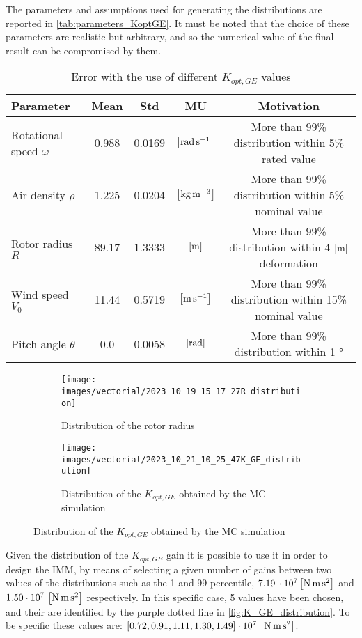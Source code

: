 The parameters and assumptions used for generating the distributions are reported in \autoref{tab:parameters_KoptGE}. It must be noted that the choice of these parameters are realistic but arbitrary, and so the numerical value of the final result can be compromised by them.

\begin{table}[htb]
  \caption{Error with the use of different $K_{opt,GE}$ values}
  \centering
  \begin{tabular}{lcccc}
  \toprule
  Parameter & Mean & Std & MU & Motivation\\ \midrule
  Rotational speed $\omega$ & 0.988 & 0.0169 & $\left[\si{\radian\per\second}\right]$ & More than 99\% distribution within 5\% rated value\\
  Air density $\rho$ &  1.225 & 0.0204 & $\left[\si{\kilo\gram\per\cubic\meter}\right]$ & More than 99\% distribution within 5\% nominal value \\
  Rotor radius $R$  & 89.17 & 1.3333 & $\left[\si{\meter}\right]$ & More than 99\% distribution within 4 $\left[\si{\meter}\right]$ deformation \\
  Wind speed $V_0$  & 11.44 & 0.5719 & $\left[\si{\meter\per\second}\right]$ & More than 99\% distribution within 15\% nominal value \\
  Pitch angle $\theta$ & 0.0 & 0.0058 & $\left[\si{\radian}\right]$ & More than 99\% distribution within  1 $\si{\degree}$ \\
 \bottomrule
  \end{tabular}
  \label{tab:parameters_KoptGE}
\end{table}

\begin{figure}[H]
  \begin{subfigure}{0.5\columnwidth}
    \centering
    \texttt{[image: images/vectorial/2023\_10\_19\_15\_17\_27R\_distribution]}
    \caption{Distribution of the rotor radius}
    \label{fig:R_distribution}
  \end{subfigure}
  \begin{subfigure}{0.5\columnwidth}
    \centering
    \texttt{[image: images/vectorial/2023\_10\_21\_10\_25\_47K\_GE\_distribution]}
    \caption{Distribution of the $K_{opt,GE}$ obtained by the \acrshort{MC} simulation}
    \label{fig:K_GE_distribution}
  \end{subfigure}
\end{figure}

Given the distribution of the $K_{opt,GE}$ gain it is possible to use it in order to design the IMM, by means of selecting a given number of gains between two values of the distributions such as the 1 and 99 percentile, $7.19 \, \cdot 10^7 \left[\si{\newton \meter \square \second}\right]$ and $1.50 \cdot 10^7 \, \left[\si{\newton \meter \square \second}\right]$ respectively. In this specific case, 5 values have been chosen, and their are identified by the purple dotted line in \autoref{fig:K_GE_distribution}. To be specific these values are: $\left[0.72, 0.91, 1.11, 1.30, 1.49 \right] \cdot 10^7 \, \left[\si{\newton\meter\square\second}\right]$. 

